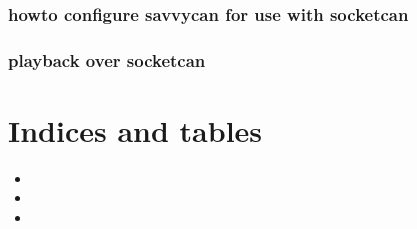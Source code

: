 \documentclass[letterpaper,10pt,english]{sphinxmanual}
\begin{document}
\subsection{howto configure savvycan for use with socketcan}
\label{\detokenize{linux/savvyCAN:howto-configure-savvycan-for-use-with-socketcan}}
\noindent{}


\subsection{playback over socketcan}
\label{\detokenize{linux/savvyCAN:playback-over-socketcan}}
\noindent{}


\chapter{Indices and tables}
\label{\detokenize{index:indices-and-tables}}\begin{itemize}
\item {} 
\sphinxAtStartPar
{}

\item {} 
\sphinxAtStartPar
{}

\item {} 
\sphinxAtStartPar
{}

\end{itemize}



\renewcommand{\indexname}{Index}
\printindex
\end{document}
